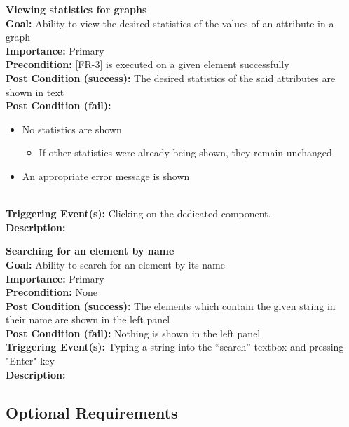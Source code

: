 \documentclass[10pt,a4paper]{report}
\newcommand{\FRDescription}[8]{
    \textbf{#1} \leavevmode \\
    \textbf{Goal: } #2 \leavevmode \\
    \textbf{Importance: } #3 \leavevmode \\
    \textbf{Precondition: } #4 \leavevmode \\
    \textbf{Post Condition (success): } #5 \leavevmode \\
    \textbf{Post Condition (fail): } #6 \leavevmode \\
    \textbf{Triggering Event(s): } #7 \leavevmode \\
    \textbf{Description: } \leavevmode \\ 
    #8}
\begin{document}
\begin{FR}
    \item \FRDescription{Viewing statistics for graphs}
    {Ability to view the desired statistics of the values of an attribute in a graph}
    {Primary}
    {\ref{FR-3} is executed on a given element successfully}
    {The desired statistics of the said attributes are shown in text}
    {\begin{itemize}
        \item No statistics are shown
        \begin{itemize}
            \item If other statistics were already being shown, they remain unchanged
        \end{itemize}
        \item An appropriate error message is shown
    \end{itemize}}
    {Clicking on the dedicated component.}
    \item \FRDescription{Searching for an element by name}
    {Ability to search for an element by its name}
    {Primary}
    {None}
    {The elements which contain the given string in their name are shown in the left panel}
    {Nothing is shown in the left panel}
    {Typing a string into the “search” textbox and pressing "Enter" key}
\end{FR}

\subsection{Optional Requirements}
\end{document}

